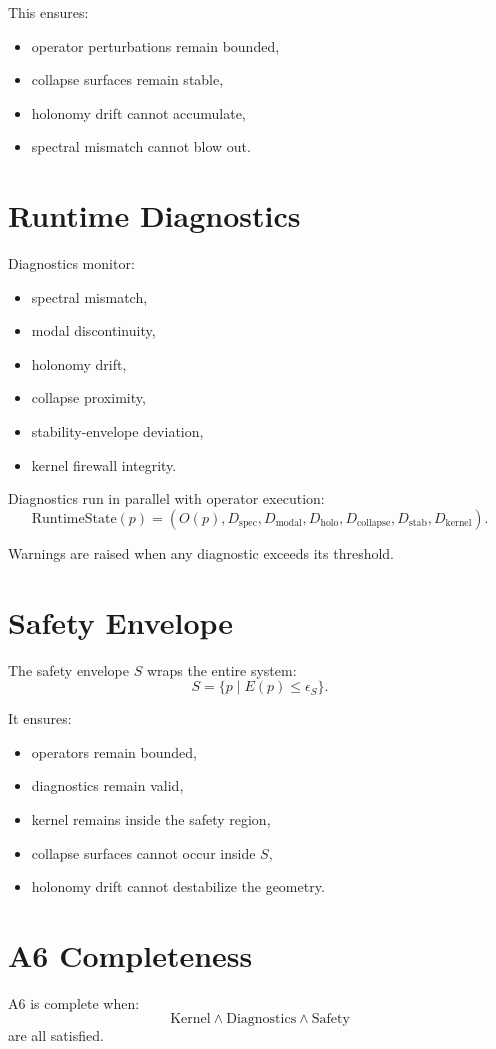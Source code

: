 \documentclass[11pt]{article}
\begin{document}
This ensures:
\begin{itemize}
  \item operator perturbations remain bounded,
  \item collapse surfaces remain stable,
  \item holonomy drift cannot accumulate,
  \item spectral mismatch cannot blow out.
\end{itemize}

\section{Runtime Diagnostics}
Diagnostics monitor:
\begin{itemize}
  \item spectral mismatch,
  \item modal discontinuity,
  \item holonomy drift,
  \item collapse proximity,
  \item stability-envelope deviation,
  \item kernel firewall integrity.
\end{itemize}

Diagnostics run in parallel with operator execution:
\[
\text{RuntimeState}(p) =
(O(p), D_{\text{spec}}, D_{\text{modal}}, D_{\text{holo}},
 D_{\text{collapse}}, D_{\text{stab}}, D_{\text{kernel}}).
\]

Warnings are raised when any diagnostic exceeds its threshold.

\section{Safety Envelope}
The safety envelope $S$ wraps the entire system:
\[
S = \{ p \mid E(p) \leq \epsilon_S \}.
\]

It ensures:
\begin{itemize}
  \item operators remain bounded,
  \item diagnostics remain valid,
  \item kernel remains inside the safety region,
  \item collapse surfaces cannot occur inside $S$,
  \item holonomy drift cannot destabilize the geometry.
\end{itemize}

\section{A6 Completeness}
A6 is complete when:
\[
\text{Kernel} \land \text{Diagnostics} \land \text{Safety}
\]
are all satisfied.
\end{document}
